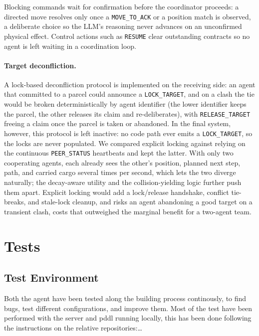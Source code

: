 \documentclass[a4paper,11pt]{article}
\begin{document}
Blocking commands wait for confirmation before the coordinator proceeds: a directed
move resolves only once a \texttt{MOVE\_TO\_ACK} or a position match is observed, a
deliberate choice so the LLM's reasoning never advances on an unconfirmed physical
effect. Control actions such as \texttt{RESUME} clear outstanding contracts so no
agent is left waiting in a coordination loop.

\paragraph{Target deconfliction.} A lock-based deconfliction protocol is implemented
on the receiving side: an agent that committed to a parcel could announce a
\texttt{LOCK\_TARGET}, and on a clash the tie would be broken deterministically by
agent identifier (the lower identifier keeps the parcel, the other releases its claim
and re-deliberates), with \texttt{RELEASE\_TARGET} freeing a claim once the parcel is
taken or abandoned. In the final system, however, this protocol is left inactive: no
code path ever emits a \texttt{LOCK\_TARGET}, so the locks are never populated. We
compared explicit locking against relying on the continuous \texttt{PEER\_STATUS}
heartbeats and kept the latter. With only two cooperating agents, each already sees
the other's position, planned next step, path, and carried cargo several times per
second, which lets the two diverge naturally; the decay-aware utility and the
collision-yielding logic further push them apart. Explicit locking would add a
lock/release handshake, conflict tie-breaks, and stale-lock cleanup, and risks an
agent abandoning a good target on a transient clash, costs that outweighed the
marginal benefit for a two-agent team.



\section{Tests}
\subsection{Test Environment}
Both the agent have been tested along the building process continously, 
to find bugs, test different configurations, and improve them. 
Most of the test have been performed with the server and pddl running locally, this has been 
done following the instructions on the relative repositories:\dots
\end{document}
